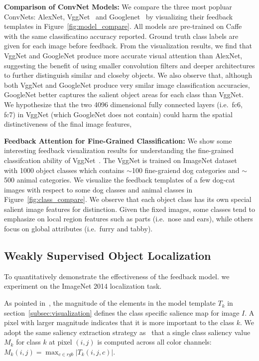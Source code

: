 \textbf{Comparison of ConvNet Models:} We compare the three most popluar ConvNets: AlexNet, VggNet~\cite{Simonyan2014Very} and Googlenet~\cite{Szegedy2014Going} by visualizing their feedback templates in Figure~\ref{fig:model_compare}. All models are pre-trained on Caffe with the same classificatino accuracy reported. Ground truth class labels are given for each image before feedback. From the visualization results, we find that VggNet and GoogleNet produce more accurate visual attention than AlexNet, suggesting the benefit of using smaller convolution filters and deeper architectures to further distinguish similar and closeby objects. We also observe that, although both VggNet and GoogleNet produce very smilar image classification accuracies, GoogleNet better captures the salient object areas for each class than VggNet. We hypothesize that the two 4096 dimensional fully connected layers (i.e.\ fc6, fc7) in VggNet (which GoogleNet does not contain) could harm the spatial distinctiveness of the final image features,  

\textbf{Feedback Attention for Fine-Grained Classification:} We show some interesting feedback visualization results for understanding the fine-grained classifcation ability of VggNet~\cite{Simonyan2014Very}. The VggNet is trained on ImageNet dataset~\cite{deng2009imagenet} with 1000 object classes which contains $\sim$100 fine-graiend dog categories and $\sim$500 animal categories. We visualize the feedback templates of a few dog-cat images with respect to some dog classes and animal classes in Figure~\ref{fig:class_compare}. We observe that each object class has its own special salient image features for distinction. Given the fixed images, some classes tend to emphasize on local region features such as parts (i.e.\ nose and ears), while others focus on global attributes (i.e.\ furry and tabby).

\subsection{Weakly Supervised Object Localization}
\label{subsec:localization}
To quantitatively demonstrate the effectiveness of the feedback model. we experiment on the ImageNet 2014 localization task.

As pointed in~\cite{simonyan2013deep}, the magnitude of the elements in the model template $T_k$ in section~\ref{subsec:visualization} defines the class specific salience map for image $I$. A pixel with larger magnitude indicates that it is more important to the class $k$. We adopt the same saliency extraction strategy as~\cite{simonyan2013deep} that a single class saliency value $M_k$ for class $k$ at pixel $(i,j)$ is computed across all color channels: $M_k(i,j) = \max_{c \in rgb} | T_k(i,j,c) |$.

